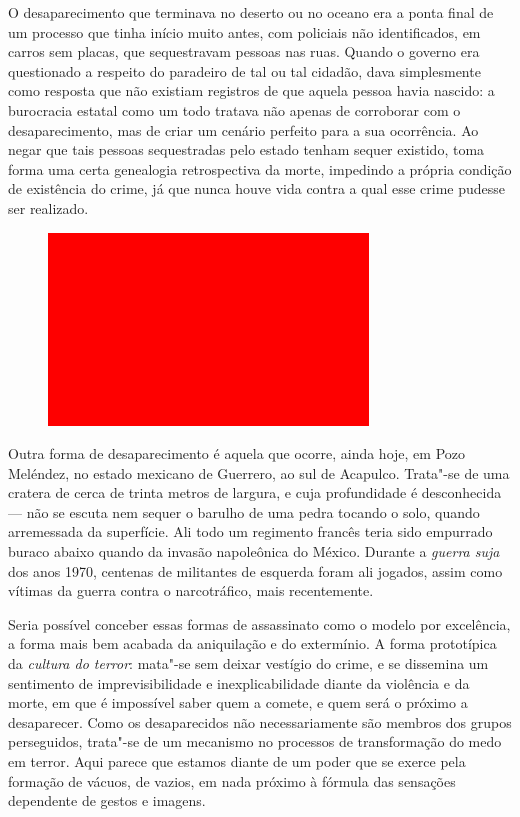 O desaparecimento que terminava no deserto ou no oceano era a ponta
final de um processo que tinha início muito antes, com policiais não
identificados, em carros sem placas, que sequestravam pessoas nas ruas.
Quando o governo era questionado a respeito do paradeiro de tal ou tal
cidadão, dava simplesmente como resposta que não existiam registros de
que aquela pessoa havia nascido: a burocracia estatal como um todo
tratava não apenas de corroborar com o desaparecimento, mas de criar um
cenário perfeito para a sua ocorrência. Ao negar que tais pessoas
sequestradas pelo estado tenham sequer existido, toma forma uma certa
genealogia retrospectiva da morte, impedindo a própria condição de
existência do crime, já que nunca houve vida contra a qual esse crime
pudesse ser realizado.

\begin{figure}[!ht]
\centering
 \includegraphics[width=85mm]{./imgs/im1.jpg}
\caption{\footnotesize{}}
\end{figure}


Outra forma de desaparecimento é aquela que ocorre, ainda hoje, em Pozo
Meléndez, no estado mexicano de Guerrero, ao sul de Acapulco. Trata"-se
de uma cratera de cerca de trinta metros de largura, e cuja profundidade
é desconhecida --- não se escuta nem sequer o barulho de uma pedra tocando
o solo, quando arremessada da superfície. Ali todo um regimento francês
teria sido empurrado buraco abaixo quando da invasão napoleônica do
México. Durante a \emph{guerra suja} dos anos 1970, centenas de
militantes de esquerda foram ali jogados, assim como vítimas da guerra
contra o narcotráfico, mais recentemente.

Seria possível conceber essas formas de assassinato como o modelo por
excelência, a forma mais bem acabada da aniquilação e do extermínio. A
forma prototípica da \emph{cultura do terror}: mata"-se sem deixar vestígio do
crime, e se dissemina um sentimento de imprevisibilidade e
inexplicabilidade diante da violência e da morte, em que é impossível
saber quem a comete, e quem será o próximo a desaparecer. Como os
desaparecidos não necessariamente são membros dos grupos perseguidos,
trata"-se de um mecanismo no processos de transformação do medo em
terror. Aqui parece que estamos diante de um poder que se exerce pela
formação de vácuos, de vazios, em nada próximo à fórmula das sensações
dependente de gestos e imagens.

